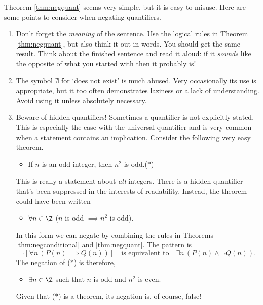 Theorem \ref{thm:negquant} seems very simple, but it is easy to misuse. Here are some points to consider when negating quantifiers.

\begin{enumerate}
  \item Don't forget the \emph{meaning} of the sentence. Use the logical rules in Theorem \ref{thm:negquant}, but also think it out in words. You should get the same result. Think about the finished sentence and read it aloud: if it \emph{sounds} like the opposite of what you started with then it probably is!
  \item The symbol $\nexists$ for `does not exist' is much abused. Very occasionally its use is appropriate, but it too often demonstrates laziness or a lack of understanding. Avoid using it unless absolutely necessary.
	\item Beware of hidden quantifiers! Sometimes a quantifier is not explicitly stated. This is especially the case with the universal quantifier and is very common when a statement contains an implication. Consider the following very easy theorem.
	\begin{itemize}\setlength{\itemsep}{0pt}
    \item[] If $n$ is an odd integer, then $n^2$ is odd.\hfill($\ast$)
  \end{itemize}
  This is really a statement about \emph{all} integers. There is a hidden quantifier that's been suppressed in the interests of readability. Instead, the theorem could have been written
 	\begin{itemize}\setlength{\itemsep}{0pt}
    \item[] $\forall n\in\Z$  ($n$ is odd $\implies n^2$ is odd).
  \end{itemize}
  In this form we can negate by combining the rules in Theorems \ref{thm:negconditional} and \ref{thm:negquant}. The pattern is
  \[\neg\left[\forall n \, (P(n)\implies Q(n))\right]\quad\text{is equivalent to}\quad \exists n \, (P(n) \land \neg Q(n)).\]
 	The negation of ($\ast$) is therefore,
 	\begin{itemize}\setlength{\itemsep}{0pt}
    \item[] $\exists n\in\Z$ such that $n$ is odd and $n^2$ is even.
  \end{itemize}
  Given that ($\ast$) is a theorem, its negation is, of course, false!
\end{enumerate}

